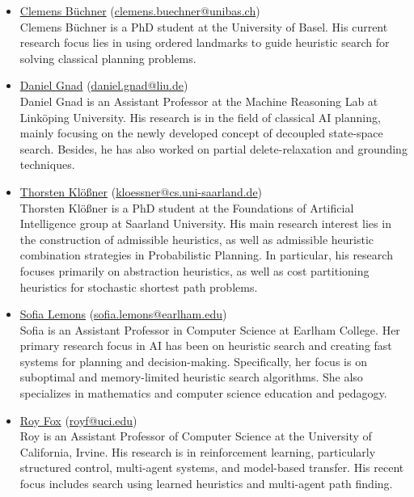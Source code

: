 \documentclass[10pt]{article}
\begin{document}
\newcommand{\organizer}[4]{\href{#2}{#1} (\href{mailto:#3}{#3})\\{#4}}
\begin{itemize}

\item \organizer{Clemens B\"uchner}{https://ai.dmi.unibas.ch/people/buechner/}{clemens.buechner@unibas.ch}
Clemens B\"uchner is a PhD student at the University of Basel. His current
research focus lies in using ordered landmarks to guide heuristic search for
solving classical planning problems.

\item \organizer{Daniel Gnad}{http://mrlab.ai/daniel-gnad/}{daniel.gnad@liu.de}
Daniel Gnad is an Assistant Professor at the Machine Reasoning Lab at
Link\"oping University. His research is in the field of classical AI planning,
mainly focusing on the newly developed concept of decoupled state-space search.
Besides, he has also worked on partial delete-relaxation and grounding
techniques.

\item \organizer{Thorsten Kl\"o\ss{}ner}{http://fai.cs.uni-saarland.de/kloessner/}{kloessner@cs.uni-saarland.de}
Thorsten Kl\"o\ss{}ner is a PhD student at the Foundations of Artificial
Intelligence group at Saarland University. His main research interest lies in
the construction of admissible heuristics, as well as admissible heuristic
combination strategies in Probabilistic Planning. In particular, his research
focuses primarily on abstraction heuristics, as well as cost partitioning
heuristics for stochastic shortest path problems.

\item \organizer{Sofia Lemons}{https://earlham.edu/faculty-staff/sofia-lemons/}{sofia.lemons@earlham.edu}
Sofia is an Assistant Professor in Computer Science at Earlham
College. Her primary research focus in AI has been on heuristic search
and creating fast systems for planning and
decision-making. Specifically, her focus is on suboptimal and
memory-limited heuristic search algorithms. She also specializes in
mathematics and computer science education and pedagogy.

\item \organizer{Roy Fox}{https://royf.org}{royf@uci.edu}
Roy is an Assistant Professor of Computer Science at the University of California, Irvine.
His research is in reinforcement learning, particularly structured control, multi-agent systems, and model-based transfer.
His recent focus includes search using learned heuristics and multi-agent path finding.


\end{itemize}
\end{document}
